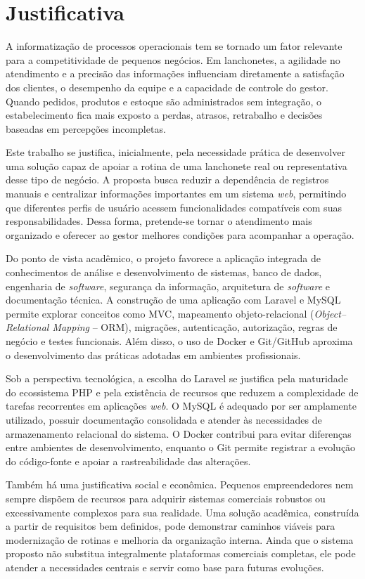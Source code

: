 \section{Justificativa}

A informatização de processos operacionais tem se tornado um fator relevante para a competitividade de pequenos negócios. Em lanchonetes, a agilidade no atendimento e a precisão das informações influenciam diretamente a satisfação dos clientes, o desempenho da equipe e a capacidade de controle do gestor. Quando pedidos, produtos e estoque são administrados sem integração, o estabelecimento fica mais exposto a perdas, atrasos, retrabalho e decisões baseadas em percepções incompletas.

Este trabalho se justifica, inicialmente, pela necessidade prática de desenvolver uma solução capaz de apoiar a rotina de uma lanchonete real ou representativa desse tipo de negócio. A proposta busca reduzir a dependência de registros manuais e centralizar informações importantes em um sistema \textit{web}, permitindo que diferentes perfis de usuário acessem funcionalidades compatíveis com suas responsabilidades. Dessa forma, pretende-se tornar o atendimento mais organizado e oferecer ao gestor melhores condições para acompanhar a operação.

Do ponto de vista acadêmico, o projeto favorece a aplicação integrada de conhecimentos de análise e desenvolvimento de sistemas, banco de dados, engenharia de \textit{software}, segurança da informação, arquitetura de \textit{software} e documentação técnica. A construção de uma aplicação com Laravel e MySQL permite explorar conceitos como MVC, mapeamento objeto-relacional (\textit{Object--Relational Mapping} -- ORM), migrações, autenticação, autorização, regras de negócio e testes funcionais. Além disso, o uso de Docker e Git/GitHub aproxima o desenvolvimento das práticas adotadas em ambientes profissionais.

Sob a perspectiva tecnológica, a escolha do Laravel se justifica pela maturidade do ecossistema PHP e pela existência de recursos que reduzem a complexidade de tarefas recorrentes em aplicações \textit{web}. O MySQL é adequado por ser amplamente utilizado, possuir documentação consolidada e atender às necessidades de armazenamento relacional do sistema. O Docker contribui para evitar diferenças entre ambientes de desenvolvimento, enquanto o Git permite registrar a evolução do código-fonte e apoiar a rastreabilidade das alterações.

Também há uma justificativa social e econômica. Pequenos empreendedores nem sempre dispõem de recursos para adquirir sistemas comerciais robustos ou excessivamente complexos para sua realidade. Uma solução acadêmica, construída a partir de requisitos bem definidos, pode demonstrar caminhos viáveis para modernização de rotinas e melhoria da organização interna. Ainda que o sistema proposto não substitua integralmente plataformas comerciais completas, ele pode atender a necessidades centrais e servir como base para futuras evoluções.


